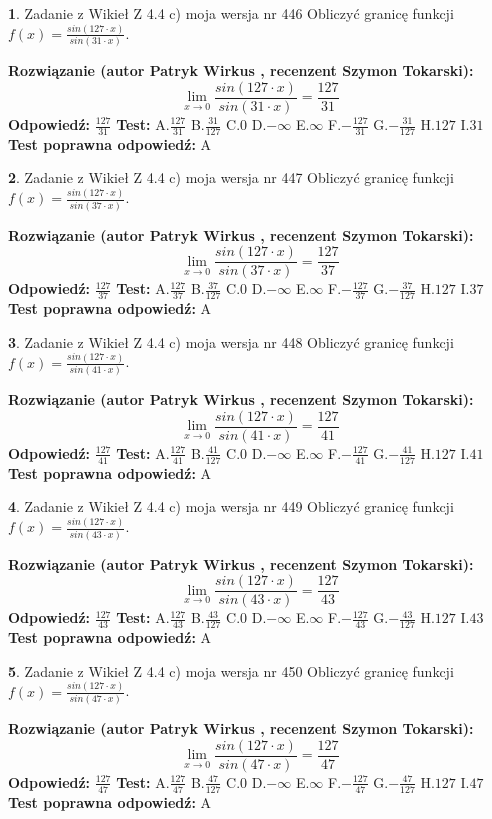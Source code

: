 \documentclass[12pt, a4paper]{article}
\theoremstyle{definition} %
\newtheorem{zad}{}
\newcommand{\zadStart}[1]{\begin{zad}#1\newline}
\newcommand{\zadStop}{\end{zad}}
\newcommand{\rozwStart}[2]{\noindent \textbf{Rozwiązanie (autor #1 , recenzent #2): }\newline}
\newcommand{\rozwStop}{\newline}
\newcommand{\odpStart}{\noindent \textbf{Odpowiedź:}\newline}
\newcommand{\odpStop}{\newline}
\newcommand{\testStart}{\noindent \textbf{Test:}\newline}
\newcommand{\testStop}{\newline}
\newcommand{\kluczStart}{\noindent \textbf{Test poprawna odpowiedź:}\newline}
\newcommand{\kluczStop}{\newline}
\begin{document}
\zadStart{Zadanie z Wikieł Z 4.4 c) moja wersja nr 446}
Obliczyć granicę funkcji $f(x)=\frac{sin(127\cdot x)}{sin(31\cdot x)}$.
\zadStop
\rozwStart{Patryk Wirkus}{Szymon Tokarski}
$$\lim\limits_{x\to 0}\frac{sin(127\cdot x)}{sin(31\cdot x)}=
\frac{127}{31}$$
\rozwStop
\odpStart
$\frac{127}{31}$
\odpStop
\testStart
A.$\frac{127}{31}$
B.$\frac{31}{127}$
C.$0$
D.$-\infty$
E.$\infty$
F.$-\frac{127}{31}$
G.$-\frac{31}{127}$
H.$127$
I.$31$
\testStop
\kluczStart
A
\kluczStop



\zadStart{Zadanie z Wikieł Z 4.4 c) moja wersja nr 447}
Obliczyć granicę funkcji $f(x)=\frac{sin(127\cdot x)}{sin(37\cdot x)}$.
\zadStop
\rozwStart{Patryk Wirkus}{Szymon Tokarski}
$$\lim\limits_{x\to 0}\frac{sin(127\cdot x)}{sin(37\cdot x)}=
\frac{127}{37}$$
\rozwStop
\odpStart
$\frac{127}{37}$
\odpStop
\testStart
A.$\frac{127}{37}$
B.$\frac{37}{127}$
C.$0$
D.$-\infty$
E.$\infty$
F.$-\frac{127}{37}$
G.$-\frac{37}{127}$
H.$127$
I.$37$
\testStop
\kluczStart
A
\kluczStop



\zadStart{Zadanie z Wikieł Z 4.4 c) moja wersja nr 448}
Obliczyć granicę funkcji $f(x)=\frac{sin(127\cdot x)}{sin(41\cdot x)}$.
\zadStop
\rozwStart{Patryk Wirkus}{Szymon Tokarski}
$$\lim\limits_{x\to 0}\frac{sin(127\cdot x)}{sin(41\cdot x)}=
\frac{127}{41}$$
\rozwStop
\odpStart
$\frac{127}{41}$
\odpStop
\testStart
A.$\frac{127}{41}$
B.$\frac{41}{127}$
C.$0$
D.$-\infty$
E.$\infty$
F.$-\frac{127}{41}$
G.$-\frac{41}{127}$
H.$127$
I.$41$
\testStop
\kluczStart
A
\kluczStop



\zadStart{Zadanie z Wikieł Z 4.4 c) moja wersja nr 449}
Obliczyć granicę funkcji $f(x)=\frac{sin(127\cdot x)}{sin(43\cdot x)}$.
\zadStop
\rozwStart{Patryk Wirkus}{Szymon Tokarski}
$$\lim\limits_{x\to 0}\frac{sin(127\cdot x)}{sin(43\cdot x)}=
\frac{127}{43}$$
\rozwStop
\odpStart
$\frac{127}{43}$
\odpStop
\testStart
A.$\frac{127}{43}$
B.$\frac{43}{127}$
C.$0$
D.$-\infty$
E.$\infty$
F.$-\frac{127}{43}$
G.$-\frac{43}{127}$
H.$127$
I.$43$
\testStop
\kluczStart
A
\kluczStop



\zadStart{Zadanie z Wikieł Z 4.4 c) moja wersja nr 450}
Obliczyć granicę funkcji $f(x)=\frac{sin(127\cdot x)}{sin(47\cdot x)}$.
\zadStop
\rozwStart{Patryk Wirkus}{Szymon Tokarski}
$$\lim\limits_{x\to 0}\frac{sin(127\cdot x)}{sin(47\cdot x)}=
\frac{127}{47}$$
\rozwStop
\odpStart
$\frac{127}{47}$
\odpStop
\testStart
A.$\frac{127}{47}$
B.$\frac{47}{127}$
C.$0$
D.$-\infty$
E.$\infty$
F.$-\frac{127}{47}$
G.$-\frac{47}{127}$
H.$127$
I.$47$
\testStop
\kluczStart
A
\kluczStop
\end{document}
